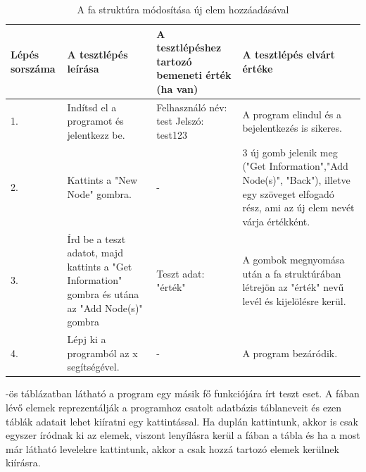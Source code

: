 \begin{table} [h]
	\begin{center}
		\resizebox{\textwidth}{!} {
			\begin{tabular}{ |p{3cm}|p{5cm}|p{5cm}|p{5cm}| } 
				\hline
				Lépés sorszáma & A tesztlépés leírása & A tesztlépéshez tartozó bemeneti érték (ha van) & A tesztlépés elvárt értéke  \\ 
				\hline
				1. & Indítsd el a programot és jelentkezz be. & Felhasználó név: test \newline Jelszó: test123 & A program elindul és a bejelentkezés is sikeres.  \\ 
				\hline
				2. & Kattints a "New Node" gombra. & - & 3 új gomb jelenik meg ("Get Information","Add Node(s)", "Back"), illetve egy szöveget elfogadó rész, ami az új elem nevét várja értékként.\\ 
				\hline
				3. & Írd be a teszt adatot, majd kattints a "Get Information" gombra és utána az "Add Node(s)" gombra & Teszt adat: "érték" & A gombok megnyomása után a fa struktúrában létrejön az "érték" nevű levél és kijelölésre kerül. \\
				\hline
				4. & Lépj ki a programból az x segítségével. & - & A program bezáródik. \\
				\hline
			\end{tabular}
		}
	\end{center}
	\caption{A fa struktúra módosítása új elem hozzáadásával}
	\label{table:addnode}
\end{table}

\newpage

-ös táblázatban látható a program egy másik fő funkciójára írt teszt eset. A fában lévő elemek reprezentálják a programhoz csatolt adatbázis táblaneveit és ezen táblák adatait lehet kiíratni egy kattintással. Ha duplán kattintunk, akkor is csak egyszer íródnak ki az elemek, viszont lenyílásra kerül a fában a tábla és ha a most már látható levelekre kattintunk, akkor a csak hozzá tartozó elemek kerülnek kiírásra.

